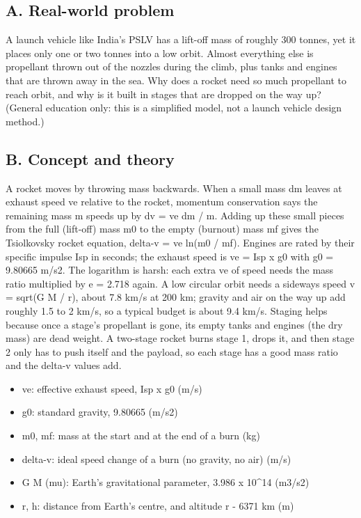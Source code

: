 \documentclass[11pt,a4paper]{article}
\begin{document}
\subsection*{A. Real-world problem}
A launch vehicle like India's PSLV has a lift-off mass of roughly 300 tonnes, yet it places only one or two tonnes into a low orbit. Almost everything else is propellant thrown out of the nozzles during the climb, plus tanks and engines that are thrown away in the sea. Why does a rocket need so much propellant to reach orbit, and why is it built in stages that are dropped on the way up? (General education only: this is a simplified model, not a launch vehicle design method.)

\subsection*{B. Concept and theory}
A rocket moves by throwing mass backwards. When a small mass dm leaves at exhaust speed ve relative to the rocket, momentum conservation says the remaining mass m speeds up by dv = ve dm / m. Adding up these small pieces from the full (lift-off) mass m0 to the empty (burnout) mass mf gives the Tsiolkovsky rocket equation, delta-v = ve ln(m0 / mf). Engines are rated by their specific impulse Isp in seconds; the exhaust speed is ve = Isp x g0 with g0 = 9.80665 m/s2. The logarithm is harsh: each extra ve of speed needs the mass ratio multiplied by e = 2.718 again. A low circular orbit needs a sideways speed v = sqrt(G M / r), about 7.8 km/s at 200 km; gravity and air on the way up add roughly 1.5 to 2 km/s, so a typical budget is about 9.4 km/s. Staging helps because once a stage's propellant is gone, its empty tanks and engines (the dry mass) are dead weight. A two-stage rocket burns stage 1, drops it, and then stage 2 only has to push itself and the payload, so each stage has a good mass ratio and the delta-v values add.

\begin{itemize}[nosep]
\item ve: effective exhaust speed, Isp x g0 (m/s)
\item g0: standard gravity, 9.80665 (m/s2)
\item m0, mf: mass at the start and at the end of a burn (kg)
\item delta-v: ideal speed change of a burn (no gravity, no air) (m/s)
\item G M (mu): Earth's gravitational parameter, 3.986 x 10\textasciicircum{}14 (m3/s2)
\item r, h: distance from Earth's centre, and altitude r - 6371 km (m)
\end{itemize}
\end{document}
